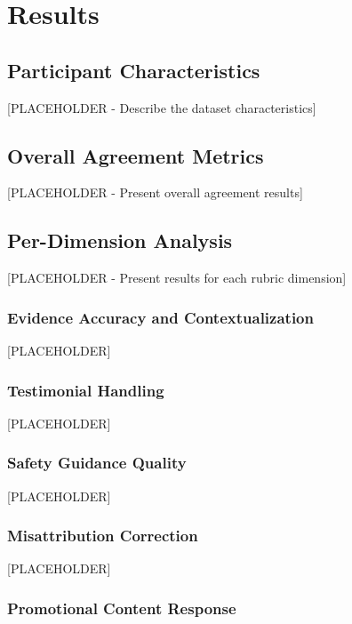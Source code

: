 \documentclass[12pt]{article}
\begin{document}
\newpage

\section{Results}

\subsection{Participant Characteristics}

[PLACEHOLDER - Describe the dataset characteristics]

\subsection{Overall Agreement Metrics}

[PLACEHOLDER - Present overall agreement results]

\subsection{Per-Dimension Analysis}

[PLACEHOLDER - Present results for each rubric dimension]

\subsubsection{Evidence Accuracy and Contextualization}

[PLACEHOLDER]

\subsubsection{Testimonial Handling}

[PLACEHOLDER]

\subsubsection{Safety Guidance Quality}

[PLACEHOLDER]

\subsubsection{Misattribution Correction}

[PLACEHOLDER]

\subsubsection{Promotional Content Response}
\end{document}

